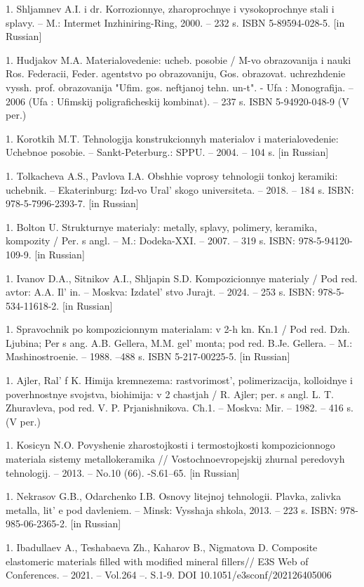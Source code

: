 1. Shljamnev A.I. i dr. Korrozionnye, zharoprochnye i vysokoprochnye
stali i splavy. -- M.: Intermet Inzhiniring-Ring, 2000. -- 232 s. ISBN
5-89594-028-5. {[}in Russian{]}

1. Hudjakov M.A. Materialovedenie: ucheb. posobie / M-vo obrazovanija i
nauki Ros. Federacii, Feder. agentstvo po obrazovaniju, Gos.
obrazovat. uchrezhdenie vyssh. prof. obrazovanija "Ufim. gos.
neftjanoj tehn. un-t". - Ufa : Monografija. -- 2006 (Ufa : Ufimskij
poligraficheskij kombinat). -- 237 s. ISBN 5-94920-048-9 (V per.)

1. Korotkih M.T. Tehnologija konstrukcionnyh materialov i
materialovedenie: Uchebnoe posobie. -- Sankt-Peterburg.: SPPU. --
2004. -- 104 s. {[}in Russian{]}

1. Tolkacheva A.S., Pavlova I.A. Obshhie voprosy tehnologii tonkoj
keramiki: uchebnik. -- Ekaterinburg: Izd-vo Ural' skogo
universiteta. -- 2018. -- 184 s. ISBN: 978-5-7996-2393-7. {[}in
Russian{]}

1. Bolton U. Strukturnye materialy: metally, splavy, polimery, keramika,
kompozity / Per. s angl. -- M.: Dodeka-XXI. -- 2007. -- 319 s. ISBN:
978-5-94120-109-9. {[}in Russian{]}

1. Ivanov D.A., Sitnikov A.I., Shljapin S.D. Kompozicionnye materialy /
Pod red. avtor: A.A. Il' in. -- Moskva:
Izdatel' stvo Jurajt. -- 2024. -- 253 s. ISBN:
978-5-534-11618-2. {[}in Russian{]}

1. Spravochnik po kompozicionnym materialam: v 2-h kn. Kn.1 / Pod red.
Dzh. Ljubina; Per s ang. A.B. Gellera, M.M. gel' monta;
pod red. B.Je. Gellera. -- M.: Mashinostroenie. -- 1988. --488 s. ISBN
5-217-00225-5. {[}in Russian{]}

1. Ajler, Ral' f K. Himija kremnezema:
rastvorimost', polimerizacija, kolloidnye i
poverhnostnye svojstva, biohimija: v 2 chastjah / R. Ajler; per. s
angl. L. T. Zhuravleva, pod red. V. P. Prjanishnikova. Ch.1. --
Moskva: Mir. -- 1982. -- 416 s. (V per.)

1. Kosicyn N.O. Povyshenie zharostojkosti i termostojkosti
kompozicionnogo materiala sistemy metallokeramika //
Vostochnoevropejskij zhurnal peredovyh tehnologij. -- 2013. -- No.10
(66). -S.61--65. {[}in Russian{]}

1. Nekrasov G.B., Odarchenko I.B. Osnovy litejnoj tehnologii. Plavka,
zalivka metalla, lit' e pod davleniem. -- Minsk:
Vysshaja shkola, 2013. -- 223 s. ISBN: 978-985-06-2365-2. {[}in
Russian{]}

1. Ibadullaev A., Teshabaeva Zh., Kaharov B., Nigmatova D. Composite
elastomeric materials filled with modified mineral fillers// E3S Web
of Conferences. -- 2021. -- Vol.264 --. S.1-9. DOI
10.1051/e3sconf/202126405006

